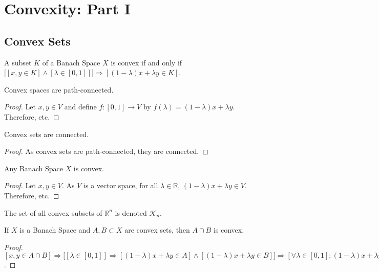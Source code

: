 \documentclass[crop=false,class=article,oneside]{standalone}
\begin{document}
    \ifx\ifworkmasterswork\undefined
        \section*{Convexity: Part I}
        \setcounter{section}{1}
    \fi
    \subsection{Convex Sets}
        \begin{definition}
        A subset $K$ of a Banach Space $X$ is convex if and only if $\big[[x,y\in K]\land  [\lambda \in [0,1]]\big]\Rightarrow[(1-\lambda)x+\lambda y\in K]$.
        \end{definition}
        \begin{theorem}
        Convex spaces are path-connected.
        \end{theorem}
        \begin{proof}
        Let $x,y\in V$ and define $f:[0,1]\rightarrow V$ by $f(\lambda) = (1-\lambda)x+\lambda y$. Therefore, etc.
        \end{proof}
        \begin{corollary}
        Convex sets are connected.
        \end{corollary}
        \begin{proof}
        As convex sets are path-connected, they are connected.
        \end{proof}
        \begin{theorem}
        Any Banach Space $X$ is convex.
        \end{theorem}
        \begin{proof}
        Let $x,y\in V$. As $V$ is a vector space, for all $\lambda \in \mathbb{R}$, $(1-\lambda)x+\lambda y\in V$. Therefore, etc.
        \end{proof}
        \begin{notation}
        The set of all convex subsets of $\mathbb{R}^n$ is denoted $\mathscr{K}_n$.
        \end{notation}
        \begin{theorem}
        If $X$ is a Banach Space and $A,B\subset X$ are convex sets, then $A\cap B$ is convex.
        \end{theorem}
        \begin{proof}
        $[x,y \in A\cap B] \Rightarrow \big[[\lambda \in [0,1]]\Rightarrow[ (1-\lambda)x+\lambda y \in A]\land [ (1-\lambda)x+\lambda y \in B]\big] \Rightarrow [\forall \lambda \in [0,1]:(1-\lambda)x+\lambda y \in A\cap B]$. 
        \end{proof}
\end{document}

